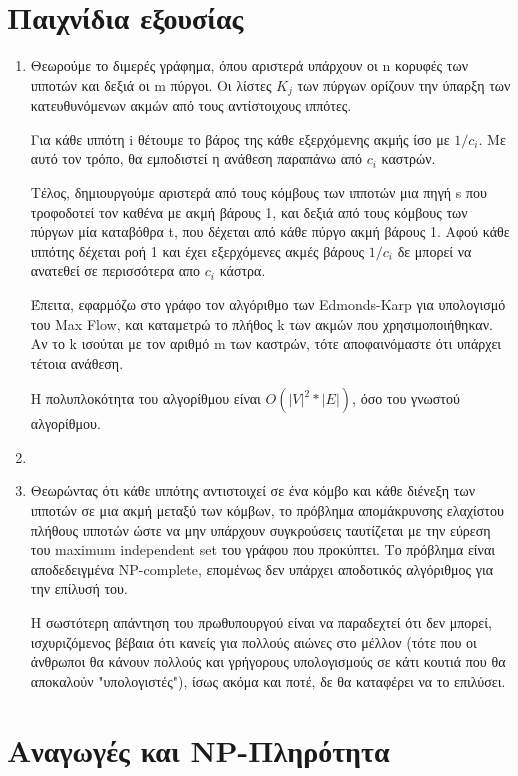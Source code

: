 \documentclass[a4paper,11pt]{article}
\begin{document}
\section{Παιχνίδια εξουσίας}
\begin{enumerate}
\item Θεωρούμε το διμερές γράφημα, όπου αριστερά υπάρχουν οι n κορυφές των
ιπποτών και δεξιά οι m πύργοι. Οι λίστες $K_j$ των πύργων ορίζουν την ύπαρξη
των κατευθυνόμενων ακμών από τους αντίστοιχους ιππότες.

Για κάθε ιππότη i θέτουμε το βάρος της κάθε εξερχόμενης ακμής ίσο με $1/c_i$.
Με αυτό τον τρόπο, θα εμποδιστεί η ανάθεση παραπάνω από $c_i$ καστρών.

Τέλος, δημιουργούμε αριστερά από τους κόμβους των ιπποτών μια πηγή s που
τροφοδοτεί τον καθένα με ακμή βάρους 1, και δεξιά από τους κόμβους των πύργων
μία καταβόθρα t, που δέχεται από κάθε πύργο ακμή βάρους 1. Aφού κάθε ιππότης
δέχεται ροή 1 και έχει εξερχόμενες ακμές βάρους $1/c_i$ δε μπορεί να ανατεθεί
σε περισσότερα απο $c_i$ κάστρα.

Έπειτα, εφαρμόζω στο γράφο τον αλγόριθμο των Edmonds-Karp για υπολογισμό του
Max Flow, και καταμετρώ το πλήθος k των ακμών που χρησιμοποιήθηκαν. Αν το k
ισούται με τον αριθμό m των καστρών, τότε αποφαινόμαστε ότι υπάρχει τέτοια
ανάθεση.

Η πολυπλοκότητα του αλγορίθμου είναι $O(|V|^2 * |E|)$, όσο του γνωστού
αλγορίθμου.

\item

\item Θεωρώντας ότι κάθε ιππότης αντιστοιχεί σε ένα κόμβο και κάθε διένεξη των
ιπποτών σε μια ακμή μεταξύ των κόμβων, το πρόβλημα απομάκρυνσης ελαχίστου
πλήθους ιπποτών ώστε να μην υπάρχουν συγκρούσεις ταυτίζεται με την εύρεση του
maximum independent set του γράφου που προκύπτει. Το πρόβλημα είναι
αποδεδειγμένα NP-complete, επομένως δεν υπάρχει αποδοτικός αλγόριθμος για την
επίλυσή του.

Η σωστότερη απάντηση του πρωθυπουργού είναι να παραδεχτεί ότι δεν μπορεί,
ισχυριζόμενος βέβαια ότι κανείς για πολλούς αιώνες στο μέλλον (τότε που οι
άνθρωποι θα κάνουν πολλούς και γρήγορους υπολογισμούς σε κάτι κουτιά που θα
αποκαλούν "υπολογιστές"), ίσως ακόμα και ποτέ, δε θα καταφέρει να το επιλύσει.

\end{enumerate}


\section{Αναγωγές και NP-Πληρότητα}
\end{document}

